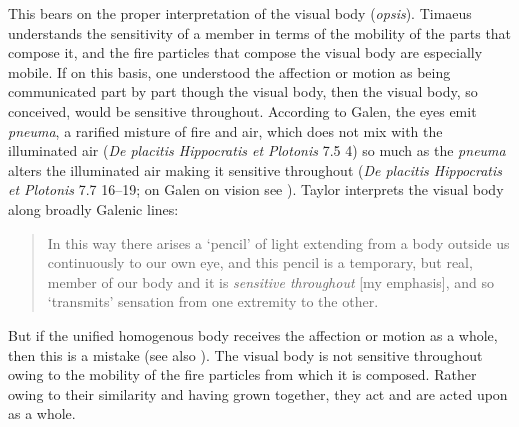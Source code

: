 This bears on the proper interpretation of the visual body (\emph{opsis}). Timaeus understands the sensitivity of a member in terms of the mobility of the parts that compose it, and the fire particles that compose the visual body are especially mobile. If on this basis, one understood the affection or motion as being communicated part by part though the visual body, then the visual body, so conceived, would be sensitive throughout. According to Galen, the eyes emit \emph{pneuma}, a rarified misture of fire and air, which does not mix with the illuminated air (\emph{De placitis Hippocratis et Plotonis} 7.5 4) so much as the \emph{pneuma} alters the illuminated air making it sensitive throughout (\emph{De placitis Hippocratis et Plotonis} 7.7 16--19; on Galen on vision see \citealt{Ierodiakonou:2014rj}). Taylor interprets the visual body along broadly Galenic lines:
\begin{quote}
	In this way there arises a `pencil' of light extending from a body outside us continuously to our own eye, and this pencil is a temporary, but real, member of our body and it is \emph{sensitive throughout} [my emphasis], and so `transmits' sensation from one extremity to the other. \citep[278]{Taylor:1928qb}
\end{quote}
But if the unified homogenous body receives the affection or motion as a whole, then this is a mistake (see also \citealt[153 n1]{Cornford:1935fk}). The visual body is not sensitive throughout owing to the mobility of the fire particles from which it is composed. Rather owing to their similarity and having grown together, they act and are acted upon as a whole.

